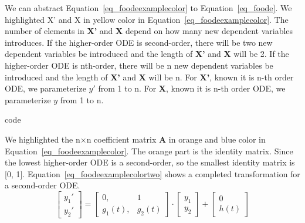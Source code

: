 We can abstract Equation~\ref{eq_foodeexamplecolor} to Equation~\ref{eq_foode}. We highlighted X' and X in yellow color in Equation~\ref{eq_foodeexamplecolor}. The number of elements in \textbf{X'} and \textbf{X} depend on how many new dependent variables introduces. If the higher-order ODE is second-order, there will be two new dependent variables be introduced and the length of \textbf{X'} and \textbf{X} will be 2. If the higher-order ODE is nth-order, there will be n new dependent variables be introduced and the length of \textbf{X'} and \textbf{X} will be n. For \textbf{X'}, known it is n-th order ODE, we parameterize $y'$ from 1 to n. For \textbf{X}, known it is n-th order ODE, we parameterize $y$ from 1 to n.

code

We highlighted the n$\times$n coefficient matrix \textbf{A} in orange and blue color in Equation~\ref{eq_foodeexamplecolor}. The orange part is the identity matrix. Since the lowest higher-order ODE is a second-order, so the smallest identity matrix is [0, 1]. Equation~\ref{eq_foodeexamplecolortwo} shows a completed transformation for a second-order ODE.
\begin{equation} \label{eq_foodeexamplecolortwo}
	\begin{bmatrix}
		{y_{1}'} \\
    {y_{2}'} 
	\end{bmatrix}
    = 
  \begin{bmatrix}
		{0}, & {1} \\
    {g_{1}(t)}, & {g_{2}(t)}
	\end{bmatrix}
    \cdot
  \begin{bmatrix}
		{y_{1}} \\
    {y_{2}} 
	\end{bmatrix}
    + 
  \begin{bmatrix}
    {0} \\
    {h(t)}
	\end{bmatrix}
\end{equation}

